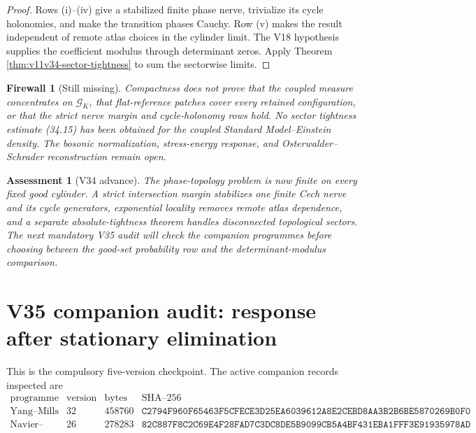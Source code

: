 \documentclass[11pt]{article}
\newtheorem{assessment}[theorem]{Assessment}
\newtheorem{firewall}[theorem]{Firewall}
\begin{document}
\begin{proof}
Rows (i)--(iv) give a stabilized finite phase nerve, trivialize its
cycle holonomies, and make the transition phases Cauchy.  Row (v) makes
the result independent of remote atlas choices in the cylinder limit.
The V18 hypothesis supplies the coefficient modulus through determinant
zeros.  Apply Theorem \ref{thm:v11v34-sector-tightness} to sum the
sectorwise limits.
\end{proof}

\begin{firewall}[Still missing]
\label{fw:v11v34-missing}
Compactness does not prove that the coupled measure concentrates on
\(\mathcal G_K\), that flat-reference patches cover every retained
configuration, or that the strict nerve margin and cycle-holonomy rows
hold.  No sector tightness estimate (34.15) has been obtained for the
coupled Standard Model--Einstein density.  The bosonic normalization,
stress-energy response, and Osterwalder--Schrader reconstruction remain
open.
\end{firewall}

\begin{assessment}[V34 advance]
\label{ass:v11v34}
The phase-topology problem is now finite on every fixed good cylinder.
A strict intersection margin stabilizes one finite Cech nerve and its
cycle generators, exponential locality removes remote atlas dependence,
and a separate absolute-tightness theorem handles disconnected
topological sectors.  The next mandatory V35 audit will check the
companion programmes before choosing between the good-set probability
row and the determinant-modulus comparison.
\end{assessment}
\section{V35 companion audit: response after stationary elimination}
\label{sec:v11v35}

This is the compulsory five-version checkpoint.  The active companion
records inspected are
\[
\begin{array}{c|c|r|l}
 \text{programme}&\text{version}&\text{bytes}&\text{SHA--256}\\ \hline
 \text{Yang--Mills}&32&458760&
 \texttt{C2794F960F65463F5CFECE3D25EA6039612A8E2CEBD8AA3B2B6BE5870269B0F0}\\
 \text{Navier--Stokes}&26&278283&
 \texttt{82C887F8C2C69E4F28FAD7C3DC8DE5B9099CB5A4BF431EBA1FFF3E91935978AD}
\end{array}
\tag{35.1}
\]
\end{document}

